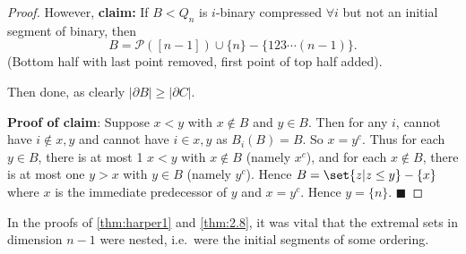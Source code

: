 \documentclass{article}
\begin{document}
\begin{proof}
  However, \textbf{claim:} If $B< Q_n$ is $i$-binary compressed $\forall i$ but not an initial segment of binary, then
  \begin{equation*}B = \mathcal{P}([n-1]) \cup \{n\} - \{123\dotsm(n-1)\}.\end{equation*}
  (Bottom half with last point removed, first point of top half added).
  \begin{center}
  \end{center}
  Then done, as clearly $|\partial B| \geq |\partial C|$.

  \textbf{Proof of claim}:
  Suppose $x < y$ with $x \notin B$ and $y \in B$.
  Then for any $i$, cannot have $i \notin x,y$ and cannot have $i \in x,y$ as $B_i(B) = B$.
  So $x = y^c$.
  Thus for each $y \in B$, there is at most 1 $x < y$ with $x \notin B$ (namely $x^c$), and for each $x \notin B$, there is at most one $y > x$ with $y \in B$ (namely $y^c$).
  Hence $B = \set{z | z \leq y} - \{x\}$ where $x$ is the immediate predecessor of $y$ and $x = y^c$.
  Hence $y = \{n\}$. $\blacksquare$
\end{proof}
\begin{remark}
  In the proofs of \cref{thm:harper1} and \cref{thm:2.8}, it was vital that the extremal sets in dimension $n-1$ were nested, i.e.\ were the initial segments of some ordering.
\end{remark}
\end{document}
